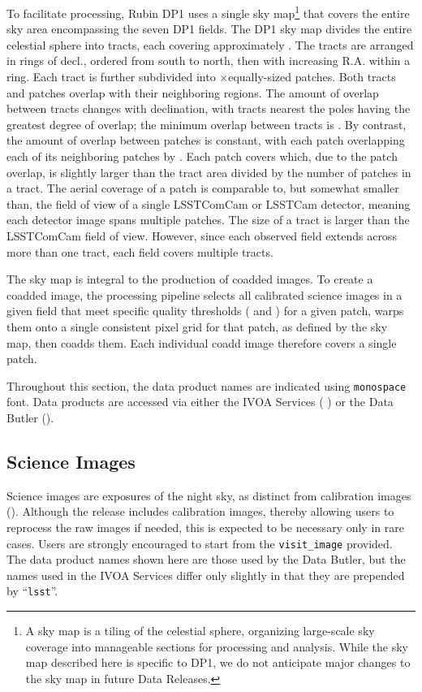 To facilitate processing, Rubin \gls{DP1} uses a single sky map\footnote{A sky map is a tiling of the celestial sphere, organizing large-scale sky coverage into manageable sections for processing and analysis. While the sky map described here is specific to \gls{DP1}, we do not anticipate major changes to the sky map in future Data Releases.} that covers the entire sky area encompassing the seven \gls{DP1} fields.
The \gls{DP1} sky map divides the entire celestial sphere into \ntotaltracts \gls{tract}s, each covering approximately \tractarea.
The \gls{tract}s are arranged in rings of decl., ordered from south to north, then with increasing R.A. within a ring.
Each \gls{tract} is further subdivided into \npatchx$\xspace\times\xspace$\npatchy equally-sized patches.
Both \gls{tract}s and patches overlap with their neighboring regions.
The amount of overlap between \gls{tract}s changes with declination, with \gls{tract}s nearest the poles having the greatest degree of overlap; the minimum overlap between tracts is \tractoverlap.
By contrast, the amount of overlap between patches is constant, with each \gls{patch} overlapping each of its neighboring patches by \patchoverlap.
Each patch covers \outerpatcharea which, due to the patch overlap, is slightly larger than the tract area divided by the number of patches in a tract.
The aerial coverage of a patch is comparable to, but somewhat smaller than, the \rawfov field of view of a single \gls{LSSTComCam} or \gls{LSSTCam} detector, meaning each detector image spans multiple patches.
The size of a tract is larger than the \gls{LSSTComCam} field of view. However, since each observed field extends across more than one tract, each field covers multiple tracts.

The sky map is integral to the production of coadded images.
To create a coadded image, the processing pipeline selects all calibrated science images in a given field that meet specific quality thresholds ( and ) for a given \gls{patch}, warps them onto a single consistent pixel grid for that \gls{patch}, as defined by the sky map, then coadds them.
Each individual coadd image therefore covers a single \gls{patch}.

Throughout this section, the data product names are indicated using \texttt{monospace} font.
Data products are accessed via either the \gls{IVOA} Services ( ) or the Data \gls{Butler} ().

\subsection{Science Images}
\label{ssec:science_images}
Science images are exposures of the night sky, as distinct from \gls{calibration} images ().
Although the release includes \gls{calibration} images, thereby allowing users to reprocess the raw images if needed, this is expected to be necessary only in rare cases.
Users are strongly encouraged to start from the \texttt{visit\_image} provided.
The data product names shown here are those used by the Data \gls{Butler}, but the names used in the \gls{IVOA} Services differ only slightly in that they are prepended by ``\texttt{lsst}''.

